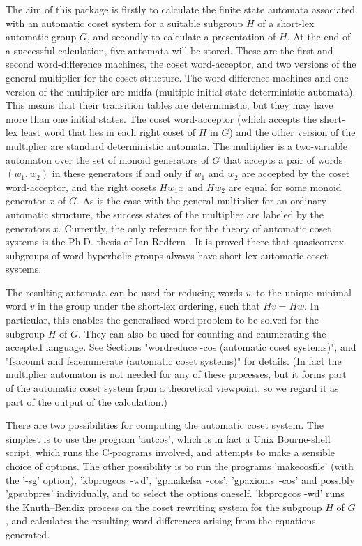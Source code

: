 
The aim of this package is firstly to calculate the finite state automata
associated with an automatic coset system for a suitable subgroup $H$ of a
short-lex automatic group $G$, and secondly to calculate a
presentation of $H$. At the end of a successful calculation, five automata
will be stored. These are the first and second word-difference machines, the
coset word-acceptor, and two versions of the general-multiplier for the coset
structure. The word-difference machines and one version of the multiplier
are midfa (multiple-initial-state deterministic automata). This means that
their transition tables are deterministic, but they may have more than one
initial states. The coset word-acceptor (which accepts the short-lex least
word that lies in each right coset of $H$ in $G$) and the other version of the
multiplier are standard deterministic automata.  The multiplier is a
two-variable automaton over the set of monoid generators of $G$ that accepts a
pair of words $(w_1,w_2)$ in these generators if and only if $w_1$ and $w_2$
are accepted by the coset word-acceptor, and the right cosets $Hw_1x$ and
$Hw_2$ are equal for some monoid generator $x$ of $G$. As is the case with the
general multiplier for an ordinary automatic structure, the success states
of the multiplier are labeled by the generators $x$.
Currently, the only reference for the theory of automatic coset systems is the
Ph.D. thesis of Ian Redfern \cite{Red93}. It is proved there that quasiconvex
subgroups of word-hyperbolic groups always have short-lex automatic coset
systems.

The resulting automata can be used for reducing words $w$ to the unique
minimal word $v$ in the group under the short-lex ordering, such that $Hv=Hw$.
In particular, this enables the generalised word-problem to be solved for the
subgroup $H$ of $G$. They can also be used for counting and enumerating the
accepted language.
See Sections "wordreduce -cos (automatic coset systems)", and
"fsacount and fsaenumerate (automatic coset systems)" for details.
(In fact the multiplier automaton is not needed for any of these processes,
but it forms part of the automatic coset system from a
theoretical viewpoint, so we regard it as part of the output of the
calculation.)

There are two possibilities for computing the automatic coset system.
The simplest is to use the program 'autcos', which is in fact a
Unix Bourne-shell script, which runs the C-programs involved,
and attempts to make a sensible choice of options.
The other possibility is to run the programs 'makecosfile' (with the '-sg'
option), 'kbprogcos\ -wd', 'gpmakefsa\ -cos', 'gpaxioms\ -cos' and possibly
'gpsubpres' individually, and to select the options oneself.
'kbprogcos -wd' runs the Knuth--Bendix process on the coset rewriting system
for the subgroup $H$ of $G$, and calculates the resulting word-differences
arising from the equations generated.

